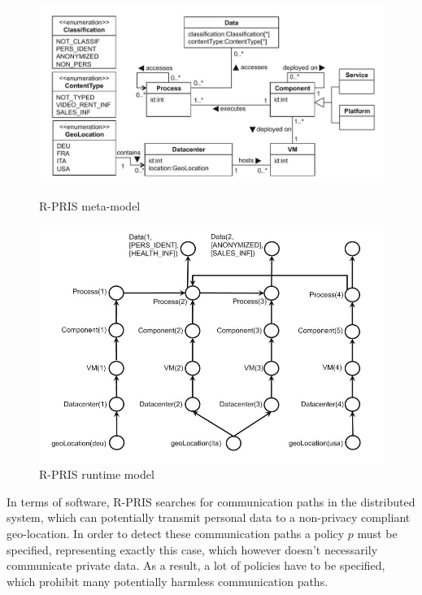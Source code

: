 \begin{figure}[h]
	\centering
	\begin{minipage}[b]{0.48\textwidth}		
		\includegraphics[width=\textwidth]{pictures/rpris_metamodel.jpg}
		\caption{R-PRIS meta-model}
		\label{fig:rpris_metamodel}
	\end{minipage}
	\begin{minipage}[b]{0.48\textwidth}
		\includegraphics[width=\textwidth]{pictures/rpris_model.jpg}
		\caption{R-PRIS runtime model}
		\label{fig:rpris_model}
	\end{minipage}
\end{figure}

In terms of software, R-PRIS searches for communication paths in the distributed system, which can potentially transmit personal data to a non-privacy compliant geo-location. In order to detect these communication paths a policy $p$ must be specified, representing exactly this case, which however doesn't necessarily communicate private data. As a result, a lot of policies have to be specified, which prohibit many potentially harmless communication paths.

